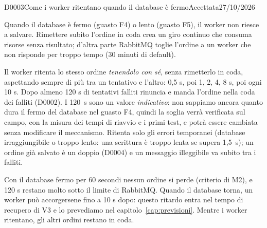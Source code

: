 \begin{decisione}{D0003}{Come i worker ritentano quando il database è fermo}{Accettata}{27/10/2026}

\contesto
Quando il database è fermo (guasto F4) o lento (guasto F5), il worker non riesce a salvare. Rimettere subito l'ordine in coda crea un giro continuo che consuma risorse senza risultato; d'altra parte RabbitMQ toglie l'ordine a un worker che non risponde per troppo tempo (30 minuti di default).

\scelta
Il worker ritenta lo stesso ordine \emph{tenendolo con sé}, senza rimetterlo in coda, aspettando sempre di più tra un tentativo e l'altro: 0,5 s, poi 1, 2, 4, 8 s, poi ogni 10 s. Dopo almeno 120 s di tentativi falliti rinuncia e manda l'ordine nella coda dei falliti (D0002). I 120~s sono un valore \emph{indicativo}: non sappiamo ancora quanto dura il fermo del database nel guasto F4, quindi la soglia verrà verificata sul campo, con la misura dei tempi di riavvio e i primi test, e potrà essere cambiata senza modificare il meccanismo. Ritenta solo gli errori temporanei (database irraggiungibile o troppo lento: una scrittura è troppo lenta se supera 1,5~s); un ordine già salvato è un doppio (D0004) e un messaggio illeggibile va subito tra i falliti.

\conseguenze
Con il database fermo per 60 secondi nessun ordine si perde (criterio di M2), e 120 s restano molto sotto il limite di RabbitMQ. Quando il database torna, un worker può accorgersene fino a 10 s dopo: questo ritardo entra nel tempo di recupero di V3 e lo prevediamo nel capitolo~\ref{cap:previsioni}. Mentre i worker ritentano, gli altri ordini restano in coda.

\end{decisione}
